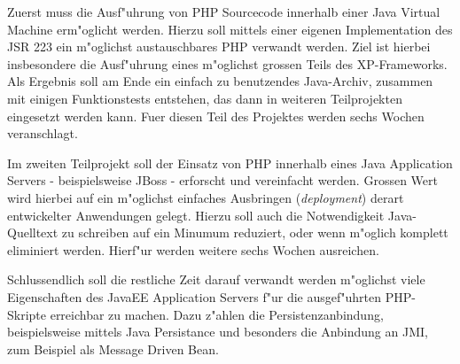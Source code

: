 Zuerst muss die Ausf"uhrung von PHP Sourcecode innerhalb einer Java Virtual Machine erm"oglicht werden. Hierzu soll
mittels einer eigenen Implementation des JSR 223 ein m"oglichst austauschbares PHP verwandt werden. 
Ziel ist hierbei insbesondere die Ausf"uhrung eines m"oglichst grossen Teils des XP-Frameworks. Als Ergebnis soll am Ende ein einfach
zu benutzendes Java-Archiv, zusammen mit einigen Funktionstests entstehen, das dann in weiteren Teilprojekten eingesetzt
werden kann. Fuer diesen Teil des Projektes werden sechs Wochen veranschlagt.

Im zweiten Teilprojekt soll der Einsatz von PHP innerhalb eines Java Application Servers - beispielsweise JBoss - erforscht
und vereinfacht werden. Grossen Wert wird hierbei auf ein m"oglichst einfaches Ausbringen (\emph{deployment}) derart 
entwickelter Anwendungen gelegt. Hierzu soll auch die Notwendigkeit Java-Quelltext zu schreiben auf ein Minumum reduziert, 
oder wenn m"oglich komplett eliminiert werden. Hierf"ur werden weitere sechs Wochen ausreichen.

Schlussendlich soll die restliche Zeit darauf verwandt werden m"oglichst viele Eigenschaften des JavaEE Application Servers
f"ur die ausgef"uhrten PHP-Skripte erreichbar zu machen. Dazu z"ahlen die Persistenzanbindung, beispielsweise mittels Java
Persistance und besonders die Anbindung an JMI, zum Beispiel als Message Driven Bean.





